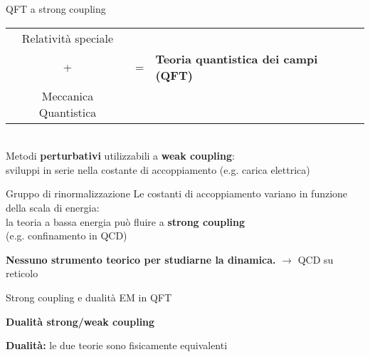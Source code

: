 \documentclass[10pt,compress,usenames,dvipsnames]{beamer}
\begin{document}
\begin{frame}{QFT a strong coupling}
\begin{tabular}{c l l }
Relatività speciale  & \\[0,1cm]
{\Large +} & {\Large=}  & \alert{\bfseries \large Teoria quantistica dei campi (QFT) }\\
Meccanica Quantistica & \\
\end{tabular}
\\
\vspace{0.3cm}
Metodi {\bfseries perturbativi} utilizzabili a \alert{\bfseries weak coupling}: \\
sviluppi in serie nella costante di accoppiamento (\small e.g.\alert { carica elettrica}) \\[0,4cm]

\begin{block}{Gruppo di rinormalizzazione}
Le costanti di accoppiamento variano in funzione della scala di energia:	\\
la teoria a bassa energia può fluire a \alert{\bfseries strong coupling} \\
(e.g. confinamento in QCD)
\end{block}

\alert{\bfseries Nessuno strumento teorico per studiarne la dinamica.}
$\longrightarrow$ QCD su reticolo

\end{frame}



\begin{frame}{Strong coupling e dualità EM in QFT}
\begin{center}
 \alert{\bfseries \Large Dualità strong/weak coupling}
\end{center}
{\bfseries Dualità:} le due teorie sono fisicamente equivalenti 
\\[0,3cm]

\end{frame}
\end{document}
